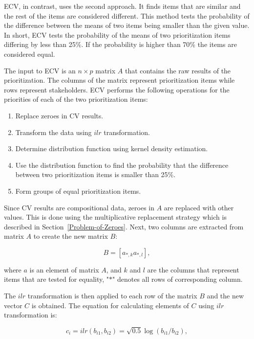 ECV, in contrast, uses the second approach.
It finds items that are similar and the rest of the items are considered different.
This method tests the probability of the difference between the means of two items being smaller than the given value. In short, ECV tests the probability of the means of two prioritization items differing by less than 25\%.
If the probability is higher than 70\% the items are considered equal.

The input to ECV is an $n\times p$ matrix $A$ that contains the raw results of the prioritization.
The columns of the matrix represent prioritization items while rows represent stakeholders.
ECV performs the following operations for the priorities of each of the two prioritization items:

\begin{enumerate}
\item Replace zeroes in CV results.
\item Transform the data using $ilr$ transformation.
\item Determine distribution function using kernel density estimation.
\item Use the distribution function to find the probability that the difference between two prioritization items is smaller than 25\%.
\item Form groups of equal prioritization items.
\end{enumerate}

Since CV results are compositional data, zeroes in $A$ are replaced with other values.
This is done using the multiplicative replacement strategy which is described in Section~\ref{Problem-of-Zeroes}.
Next, two columns are extracted from matrix $A$ to create the new matrix $B$:

\begin{equation}
	B=\left[a_{*,k}a_{*,l}\right],\label{eq:b}
\end{equation}
	
where $a$ is an element of matrix $A$, and $k$ and $l$ are the columns that represent items that are tested for equality, "$*$" denotes all rows of corresponding column.

The $ilr$ transformation is then applied to each row of the matrix $B$ and the new vector $C$ is obtained. The equation for calculating elements of $C$ using $ilr$ transformation is:

\begin{equation}
	c_{i}=ilr(b_{i1},b_{i2})=\sqrt{0.5}\log(b_{i1}/b_{i2}),\label{eq:c}
\end{equation}

